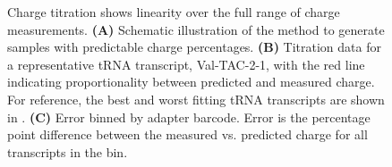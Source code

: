 \documentclass[9pt,lineno]{elife}
\begin{document}
\begin{figure}[ht!]
\centering
{}
\caption{
Charge titration shows linearity over the full range of charge measurements.
\textbf{(A)} Schematic illustration of the method to generate samples with predictable charge percentages.
\textbf{(B)} Titration data for a representative tRNA transcript, Val-TAC-2-1, with the red line indicating proportionality between predicted and measured charge.
For reference, the best and worst fitting tRNA transcripts are shown in .
\textbf{(C)} Error binned by adapter barcode.
Error is the percentage point difference between the measured vs. predicted charge for all transcripts in the bin.
}
\label{fig:Fig5}

\label{figsupp:f5S1}


\end{figure}
\end{document}
